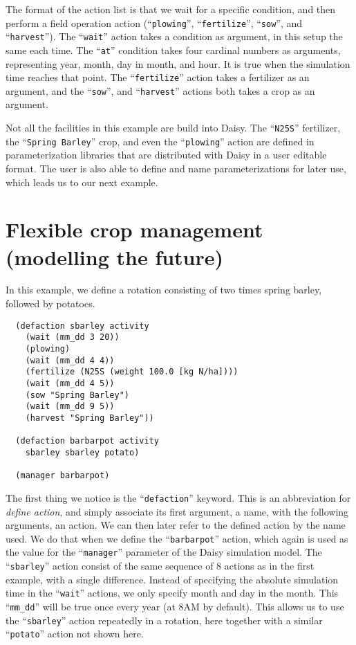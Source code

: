 \documentclass[a4paper]{article}
\newcommand{\dname}[1]{``\texttt{#1}''}
\begin{document}
The format of the action list is that we wait for a specific
condition, and then perform a field operation action
(\dname{plowing}, \dname{fertilize}, \dname{sow}, and
\dname{harvest}).  The \dname{wait} action takes a condition as
argument, in this setup the same each time.  The \dname{at}
condition takes four cardinal numbers as arguments, representing year,
month, day in month, and hour.  It is true when the simulation time
reaches that point.  The \dname{fertilize} action takes a
fertilizer as an argument, and the \dname{sow}, and
\dname{harvest} actions both takes a crop as an argument.

Not all the facilities in this example are build into Daisy.  The
\dname{N25S} fertilizer, the \dname{Spring Barley} crop, and
even the \dname{plowing} action are defined in parameterization
libraries that are distributed with Daisy in a user editable format.
The user is also able to define and name parameterizations for later
use, which leads us to our next example.

\section{Flexible crop management (modelling the future)}
    
In this example, we define a rotation consisting of two times spring
barley, followed by potatoes.
\begin{verbatim}
  (defaction sbarley activity
    (wait (mm_dd 3 20))
    (plowing)
    (wait (mm_dd 4 4))
    (fertilize (N25S (weight 100.0 [kg N/ha])))
    (wait (mm_dd 4 5))
    (sow "Spring Barley")
    (wait (mm_dd 9 5))
    (harvest "Spring Barley"))
  
  (defaction barbarpot activity
    sbarley sbarley potato)
  
  (manager barbarpot)
\end{verbatim}
The first thing we notice is the \dname{defaction} keyword.  This is
an abbreviation for \emph{define action}, and simply associate its
first argument, a name, with the following arguments, an action.  We
can then later refer to the defined action by the name used.  We do
that when we define the \dname{barbarpot} action, which again is used
as the value for the \dname{manager} parameter of the Daisy simulation
model.  The \dname{sbarley} action consist of the same sequence of 8
actions as in the first example, with a single difference.  Instead of
specifying the absolute simulation time in the \dname{wait} actions,
we only specify month and day in the month.  This \dname{mm\_dd} will
be true once every year (at 8AM by default).  This allows us to use
the \dname{sbarley} action repeatedly in a rotation, here together
with a similar \dname{potato} action not shown here.
\end{document}
